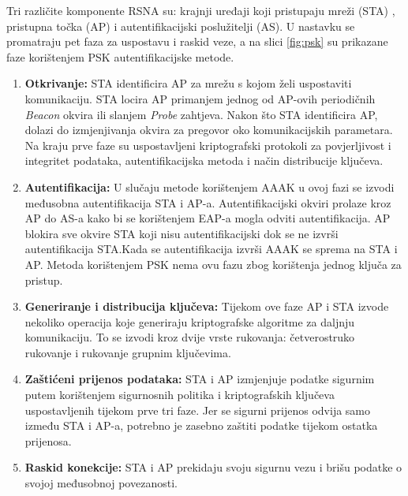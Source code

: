\documentclass[times, utf8, diplomski]{fer}
\begin{document}
Tri različite komponente RSNA su: krajnji uređaji koji pristupaju mreži (STA) , pristupna točka (AP)  i autentifikacijski poslužitelji (AS). U nastavku se promatraju pet faza za uspostavu i raskid veze, a na slici \ref{fig:psk} su prikazane faze korištenjem PSK autentifikacijske metode.
\begin{enumerate}
    \item\textbf{Otkrivanje:} STA identificira AP za mrežu s kojom želi uspostaviti komunikaciju. STA locira AP primanjem jednog od AP-ovih periodičnih \emph{Beacon} okvira ili slanjem \emph{Probe} zahtjeva. Nakon što STA identificira AP, dolazi do izmjenjivanja okvira za pregovor oko komunikacijskih parametara. Na kraju prve faze su uspostavljeni kriptografski protokoli za povjerljivost i integritet podataka, autentifikacijska metoda i način distribucije ključeva.
    \item\textbf{Autentifikacija:} U slučaju metode korištenjem AAAK u ovoj fazi se izvodi međusobna autentifikacija STA i AP-a. Autentifikacijski okviri prolaze kroz AP do AS-a kako bi se korištenjem EAP-a mogla odviti autentifikacija. AP blokira sve okvire STA koji nisu autentifikacijski dok se ne izvrši autentifikacija STA.Kada se autentifikacija izvrši AAAK se sprema na STA i AP. Metoda korištenjem PSK nema ovu fazu zbog korištenja jednog ključa za pristup.
    \item\textbf{Generiranje i distribucija ključeva:} Tijekom ove faze AP i STA izvode nekoliko operacija koje generiraju kriptografske algoritme za daljnju komunikaciju. To se izvodi kroz dvije vrste rukovanja: četverostruko rukovanje i rukovanje grupnim ključevima.
    \item\textbf{Zaštićeni prijenos podataka:} STA i AP izmjenjuje podatke sigurnim putem korištenjem sigurnosnih politika i kriptografskih ključeva uspostavljenih tijekom prve tri faze. Jer se sigurni prijenos odvija samo između STA i AP-a, potrebno je zasebno zaštiti podatke tijekom ostatka prijenosa.
    \item\textbf{Raskid konekcije:} STA i AP prekidaju svoju sigurnu vezu i brišu podatke o svojoj međusobnoj povezanosti\citep{NIST}.
\end{enumerate}
\end{document}
